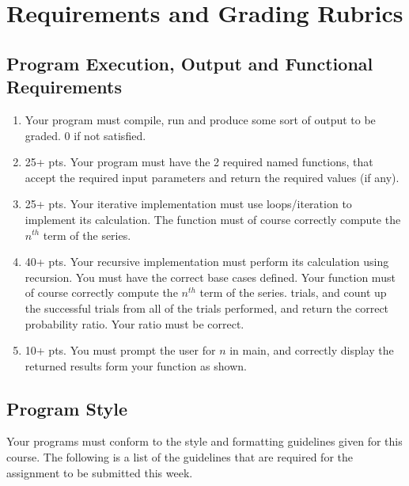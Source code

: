 \documentclass[11pt]{article}
\begin{document}
\section*{Requirements and Grading Rubrics}
\label{sec-5}
\subsection*{Program Execution, Output and Functional Requirements}
\label{sec-5-1}


\begin{enumerate}
\item Your program must compile, run and produce some sort of output to be
  graded. 0 if not satisfied.
\item 25+ pts.  Your program must have the 2 required named functions,
   that accept the required input parameters and return the required
   values (if any).
\item 25+ pts. Your iterative implementation must use loops/iteration to implement
   its calculation.  The function must of course correctly compute the $n^{th}$
   term of the series.
\item 40+ pts. Your recursive implementation must perform its calculation using
   recursion.  You must have the correct base cases defined.  Your function must
   of course correctly compute the $n^{th}$ term of the series.
   trials, and count up the successful trials from all of the trials performed,
   and return the correct probability ratio.  Your ratio must be correct.
\item 10+ pts. You must prompt the user for $n$ in main, and correctly display
   the returned results form your function as shown.
\end{enumerate}
\subsection*{Program Style}
\label{sec-5-2}


Your programs must conform to the style and formatting guidelines
given for this course.  The following is a list of the guidelines that
are required for the assignment to be submitted this week.
\end{document}

